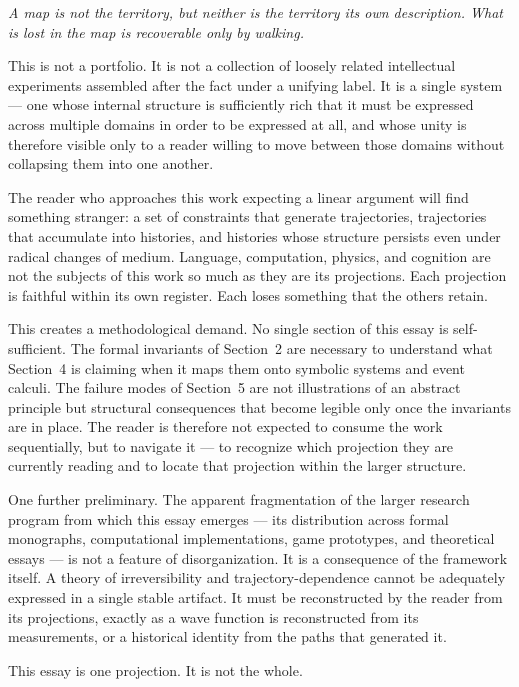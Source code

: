 \documentclass[12pt, twoside]{article}
\theoremstyle{plain}
\theoremstyle{definition}
\theoremstyle{remark}
\begin{document}
\epigraph{\itshape
  A map is not the territory, but neither is the territory its own description.
  What is lost in the map is recoverable only by walking.}{}

This is not a portfolio.
It is not a collection of loosely related intellectual experiments assembled
after the fact under a unifying label.
It is a single system — one whose internal structure is sufficiently rich
that it must be expressed across multiple domains in order to be expressed
at all, and whose unity is therefore visible only to a reader willing to
move between those domains without collapsing them into one another.

The reader who approaches this work expecting a linear argument will find
something stranger: a set of constraints that generate trajectories,
trajectories that accumulate into histories, and histories whose structure
persists even under radical changes of medium.
Language, computation, physics, and cognition are not the subjects of this
work so much as they are its projections.
Each projection is faithful within its own register.
Each loses something that the others retain.

This creates a methodological demand.
No single section of this essay is self-sufficient.
The formal invariants of Section~2 are necessary to understand
what Section~4 is claiming when it maps them onto symbolic systems and
event calculi.
The failure modes of Section~5 are not illustrations of an abstract
principle but structural consequences that become legible only once the
invariants are in place.
The reader is therefore not expected to consume the work sequentially,
but to navigate it — to recognize which projection they are currently
reading and to locate that projection within the larger structure.

One further preliminary.
The apparent fragmentation of the larger research program from which this
essay emerges — its distribution across formal monographs, computational
implementations, game prototypes, and theoretical essays — is not a
feature of disorganization.
It is a consequence of the framework itself.
A theory of irreversibility and trajectory-dependence cannot be adequately
expressed in a single stable artifact.
It must be reconstructed by the reader from its projections,
exactly as a wave function is reconstructed from its measurements,
or a historical identity from the paths that generated it.

This essay is one projection.
It is not the whole.

\newpage
\end{document}
